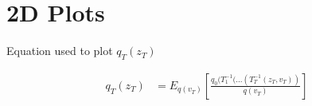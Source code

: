 \documentclass{article}
\begin{document}

\section{2D Plots}

Equation used to plot $q_{T}(z_{T})$

\begin{align}
    q_{T}(z_{T}) &= E_{q(v_T)} \left[ \frac {q_{0}(T_{1}^{-1}(...(T_{T}^{-1}(z_{T},v_{T}))} { q(v_{T})}  \right ]
\end{align}
\end{document}
